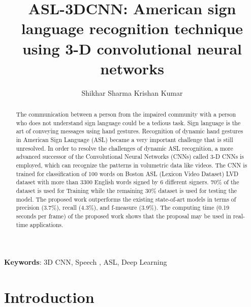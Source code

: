 \documentclass[
  manuscript=article,  %
  layout=preprint,  %
  year=20xx,
  volume=x,
]{joas}
\date{}  %
\title{ASL-3DCNN: American sign language recognition technique using 3-D convolutional neural networks
}
\author{Shikhar Sharma   Krishan Kumar}
\begin{document}
 \maketitle


\begin{abstract}
The communication between a person from the impaired community with a person who does not understand sign language could be a tedious task. Sign language is the art of conveying messages using hand gestures. Recognition of dynamic hand gestures in American Sign Language (ASL) became a very important challenge that is still unresolved. In order to resolve the challenges of dynamic ASL recognition, a more advanced successor of the Convolutional Neural Networks (CNNs) called 3-D CNNs is employed, which can recognize the patterns in volumetric data like videos. The CNN is trained for classification of 100 words on Boston ASL (Lexicon Video Dataset) LVD dataset with more than 3300 English words signed by 6 different signers. $70\%$ of the dataset is used for Training while the remaining $30\%$ dataset is used for testing the model. The proposed work outperforms the existing state-of-art models in terms of precision ($3.7\%$), recall ($4.3\%$), and f-measure ($3.9\%$). The computing time (0.19 seconds per frame) of the proposed work shows that the proposal may be used in real-time applications.  %
\end{abstract}

\textbf{Keywords}: 3D CNN, Speech , ASL, Deep Learning 
\newpage

\tableofcontents{}

\newpage
\section{Introduction}
\end{document}
